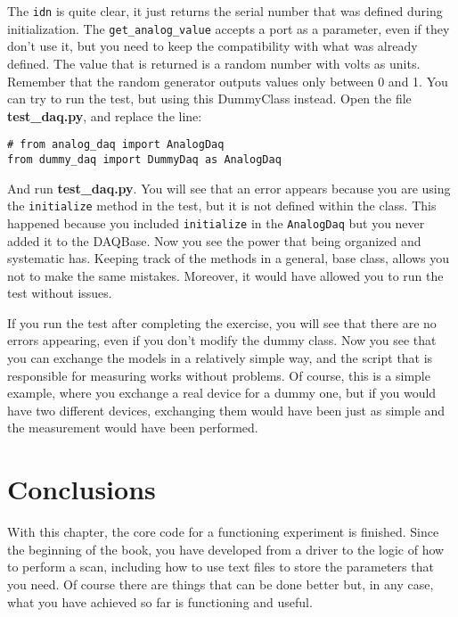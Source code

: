 {The \texttt{idn} is quite clear, it just returns the serial number that
was defined during initialization. The \texttt{get_analog_value}
accepts a port as a parameter, even if they don't use it, but you need
to keep the compatibility with what was already defined. The value that
is returned is a random number with volts as units. Remember that the
random generator outputs values only between 0 and 1. You can try to run
the test, but using this DummyClass instead. Open the file
\textbf{test\_daq.py}, and replace the line:

\begin{verbatim}
# from analog_daq import AnalogDaq
from dummy_daq import DummyDaq as AnalogDaq
\end{verbatim}

And run \textbf{test\_daq.py}. You will see that an error appears
because you are using the \texttt{initialize} method in the test, but it
is not defined within the class. This happened because you included
\texttt{initialize} in the
\texttt{AnalogDaq} but you never added it to the DAQBase.
Now you see the power that being organized and systematic has. Keeping
track of the methods in a general, base class, allows you not to make
the same mistakes. Moreover, it would have allowed you to run the test
without issues.


If you run the test after completing the exercise, you will see that
there are no errors appearing, even if you don't modify the dummy class.
Now you see that you can exchange the models in a relatively simple way,
and the script that is responsible for measuring works without problems.
Of course, this is a simple example, where you exchange a real device
for a dummy one, but if you would have two different devices, exchanging
them would have been just as simple and the measurement would have
been performed.


\section{Conclusions}\label{conclusions}
With this chapter, the core code for a functioning experiment is
finished. Since the beginning of the book, you have developed from a
driver to the logic of how to perform a scan, including how to use text
files to store the parameters that you need. Of course there are things
that can be done better but, in any case, what you have achieved so far
is functioning and useful.

}
